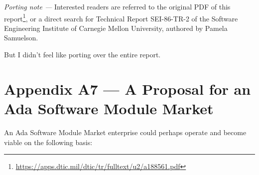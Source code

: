 \documentclass[12pt,final]{article}
\begin{document}
\textit{Porting note —} Interested readers are referred to the original PDF of
this
report\footnote{\url{https://apps.dtic.mil/dtic/tr/fulltext/u2/a188561.pdf}},
or a direct search for Technical Report SEI-86-TR-2 of the Software Engineering
Institute of Carnegie Mellon University, authored by Pamela Samuelson.

But I didn’t feel like porting over the entire report.

\newpage

\section*{Appendix A7 — A Proposal for an Ada Software Module Market}

An Ada Software Module Market enterprise could perhaps operate and become
viable on the following basis:
\end{document}
